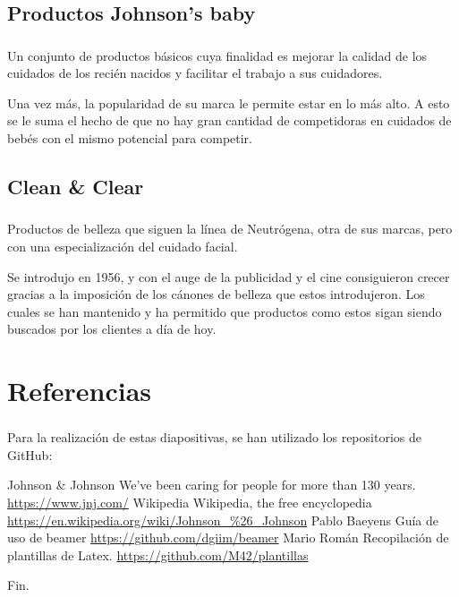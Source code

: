 \documentclass[compress, aspectratio=169]{beamer} %
\begin{document}
	\subsection{Productos Johnson's baby}
		\begin{frame}
			\frametitle{\insertsubsection}
			Un conjunto de productos básicos cuya finalidad es mejorar la calidad de los cuidados de los
			recién nacidos y facilitar el trabajo a sus cuidadores.
			
			Una vez más, la popularidad de su marca le permite estar en lo más alto. A esto se le suma el
			hecho de que no hay gran cantidad de competidoras en cuidados de bebés con el mismo potencial
			para competir.
		\end{frame}
		
		\subsection{Clean \& Clear}
			\begin{frame}
				\frametitle{\insertsubsection}
				Productos de belleza que siguen la línea de Neutrógena, otra de sus marcas, pero con una
				especialización del cuidado facial.
				
				Se introdujo en 1956, y con el auge de la publicidad y el cine consiguieron crecer gracias
				a la imposición de los cánones de belleza que estos introdujeron. Los cuales se han mantenido
				y ha permitido que productos como estos sigan siendo buscados por los clientes a día de hoy.
			\end{frame}
	
\section{Referencias}
	\begin{frame}
		\frametitle{\insertsection}
		
		Para la realización de estas diapositivas, se han utilizado los repositorios de GitHub:
		
		\footnotesize{
		\begin{thebibliography}{7} %
			 Johnson \& Johnson
				\newblock We've been caring for people for more than 130 years.
				\newblock \url{https://www.jnj.com/}
			 Wikipedia
				\newblock Wikipedia, the free encyclopedia
				\newblock \url{https://en.wikipedia.org/wiki/Johnson\_\%26\_Johnson}
			 Pablo Baeyens
				\newblock Guía de uso de beamer
				\newblock \url{https://github.com/dgiim/beamer}
			 Mario Román
				\newblock Recopilación de plantillas de Latex.
				\newblock \url{https://github.com/M42/plantillas}
		\end{thebibliography}
		}
	\end{frame}


\begin{frame}
\Huge{\centerline{Fin.}}
\end{frame}

\end{document}
